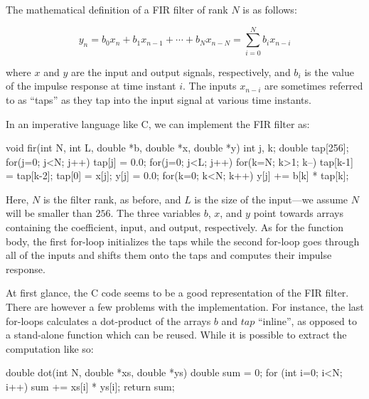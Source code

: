 \documentclass[../paper.tex]{subfiles}
\begin{document}

The mathematical definition of a FIR filter of rank $N$ is as follows:

\begin{equation}
y_{n} = b_{0} x_{n} + b_{1} x_{n-1} + \cdots + b_{N} x_{n-N} = \sum_{i=0}^{N} b_{i} x_{n-i}
\end{equation}
\vspace{1mm}

\noindent where $x$ and $y$ are the input and output signals, respectively, and $b_i$ is the value of the impulse response at time instant $i$. The inputs $x_{n-i}$ are sometimes referred to as ``taps'' as they tap into the input signal at various time instants. 

In an imperative language like C, we can implement the FIR filter as:

\begin{code}
void fir(int N, int L, double *b, double *x, double *y) {
 int j, k;
 double tap[256];
 for(j=0; j<N; j++) tap[j] = 0.0;
 for(j=0; j<L; j++) {
  for(k=N; k>1; k--) tap[k-1] = tap[k-2];
  tap[0] = x[j];
  y[j] = 0.0;
  for(k=0; k<N; k++) y[j] += b[k] * tap[k];
 }
}
\end{code}

\noindent Here, $N$ is the filter rank, as before, and $L$ is the size of the input---we assume $N$ will be smaller than $256$. The three variables $b$, $x$, and $y$ point towards arrays containing the coefficient, input, and output, respectively. As for the function body, the first for-loop initializes the taps while the second for-loop goes through all of the inputs and shifts them onto the taps and computes their impulse response.

At first glance, the C code seems to be a good representation of the FIR filter. There are however a few problems with the implementation. For instance, the last for-loops calculates a dot-product of the arrays $b$ and $tap$ ``inline'', as opposed to a stand-alone function which can be reused. While it is possible to extract the computation like so:


\begin{code}
double dot(int N, double *xs, double *ys) {
  double sum = 0;
  for (int i=0; i<N; i++) sum += xs[i] * ys[i];
  return sum;
}
\end{code}
\end{document}
